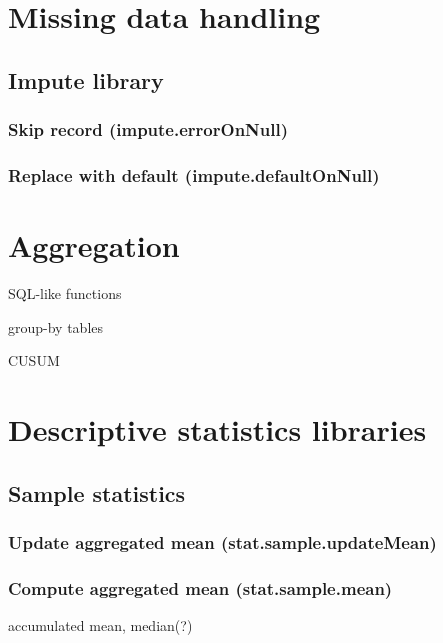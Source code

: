 \documentclass{article}
\theoremstyle{definition}
\begin{document}
\section{Missing data handling}

\subsection{Impute library}

\subsubsection{Skip record (impute.errorOnNull)}

\subsubsection{Replace with default (impute.defaultOnNull)}

\pagebreak

\section{Aggregation}

SQL-like functions

group-by tables

CUSUM

\pagebreak

\section{Descriptive statistics libraries}

\subsection{Sample statistics}

\subsubsection{Update aggregated mean (stat.sample.updateMean)}

\subsubsection{Compute aggregated mean (stat.sample.mean)}

accumulated mean, median(?)
\end{document}
